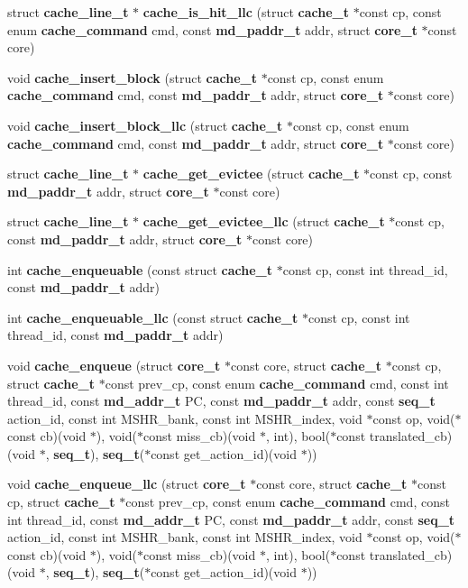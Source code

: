 \begin{CompactItemize}
\item 
struct {\bf cache\_\-line\_\-t} $\ast$ {\bf cache\_\-is\_\-hit\_\-llc} (struct {\bf cache\_\-t} $\ast$const cp, const enum {\bf cache\_\-command} cmd, const {\bf md\_\-paddr\_\-t} addr, struct {\bf core\_\-t} $\ast$const core)
\item 
void {\bf cache\_\-insert\_\-block} (struct {\bf cache\_\-t} $\ast$const cp, const enum {\bf cache\_\-command} cmd, const {\bf md\_\-paddr\_\-t} addr, struct {\bf core\_\-t} $\ast$const core)
\item 
void {\bf cache\_\-insert\_\-block\_\-llc} (struct {\bf cache\_\-t} $\ast$const cp, const enum {\bf cache\_\-command} cmd, const {\bf md\_\-paddr\_\-t} addr, struct {\bf core\_\-t} $\ast$const core)
\item 
struct {\bf cache\_\-line\_\-t} $\ast$ {\bf cache\_\-get\_\-evictee} (struct {\bf cache\_\-t} $\ast$const cp, const {\bf md\_\-paddr\_\-t} addr, struct {\bf core\_\-t} $\ast$const core)
\item 
struct {\bf cache\_\-line\_\-t} $\ast$ {\bf cache\_\-get\_\-evictee\_\-llc} (struct {\bf cache\_\-t} $\ast$const cp, const {\bf md\_\-paddr\_\-t} addr, struct {\bf core\_\-t} $\ast$const core)
\item 
int {\bf cache\_\-enqueuable} (const struct {\bf cache\_\-t} $\ast$const cp, const int thread\_\-id, const {\bf md\_\-paddr\_\-t} addr)
\item 
int {\bf cache\_\-enqueuable\_\-llc} (const struct {\bf cache\_\-t} $\ast$const cp, const int thread\_\-id, const {\bf md\_\-paddr\_\-t} addr)
\item 
void {\bf cache\_\-enqueue} (struct {\bf core\_\-t} $\ast$const core, struct {\bf cache\_\-t} $\ast$const cp, struct {\bf cache\_\-t} $\ast$const prev\_\-cp, const enum {\bf cache\_\-command} cmd, const int thread\_\-id, const {\bf md\_\-addr\_\-t} PC, const {\bf md\_\-paddr\_\-t} addr, const {\bf seq\_\-t} action\_\-id, const int MSHR\_\-bank, const int MSHR\_\-index, void $\ast$const op, void($\ast$const cb)(void $\ast$), void($\ast$const miss\_\-cb)(void $\ast$, int), bool($\ast$const translated\_\-cb)(void $\ast$, {\bf seq\_\-t}), {\bf seq\_\-t}($\ast$const get\_\-action\_\-id)(void $\ast$))
\item 
void {\bf cache\_\-enqueue\_\-llc} (struct {\bf core\_\-t} $\ast$const core, struct {\bf cache\_\-t} $\ast$const cp, struct {\bf cache\_\-t} $\ast$const prev\_\-cp, const enum {\bf cache\_\-command} cmd, const int thread\_\-id, const {\bf md\_\-addr\_\-t} PC, const {\bf md\_\-paddr\_\-t} addr, const {\bf seq\_\-t} action\_\-id, const int MSHR\_\-bank, const int MSHR\_\-index, void $\ast$const op, void($\ast$const cb)(void $\ast$), void($\ast$const miss\_\-cb)(void $\ast$, int), bool($\ast$const translated\_\-cb)(void $\ast$, {\bf seq\_\-t}), {\bf seq\_\-t}($\ast$const get\_\-action\_\-id)(void $\ast$))

\end{CompactItemize}
